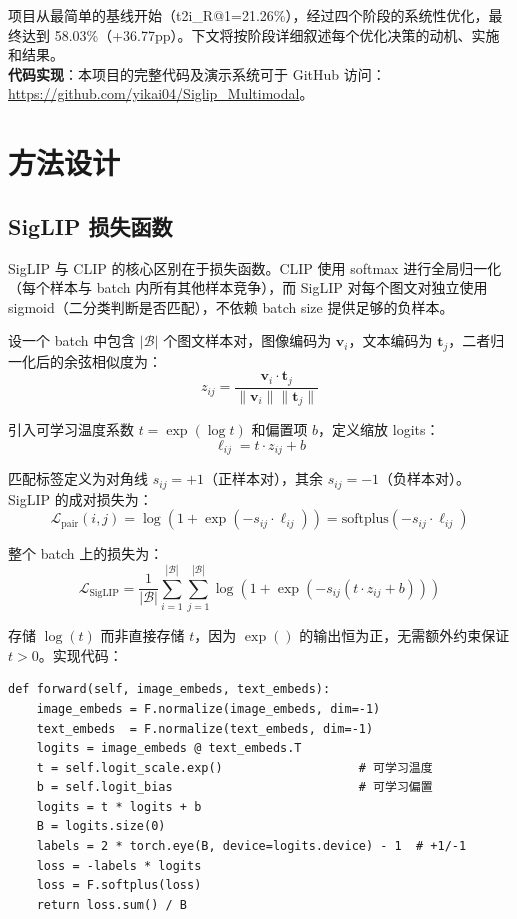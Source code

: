 \documentclass[12pt,a4paper]{article}
\begin{document}
项目从最简单的基线开始（t2i\_R@1=21.26\%），经过四个阶段的系统性优化，最终达到 58.03\%（+36.77pp）。下文将按阶段详细叙述每个优化决策的动机、实施和结果。\\

\vspace{1em}
\noindent \textbf{代码实现}：本项目的完整代码及演示系统可于 GitHub 访问：\url{https://github.com/yikai04/Siglip_Multimodal}。

\section{方法设计}

\subsection{SigLIP 损失函数}

SigLIP 与 CLIP 的核心区别在于损失函数。CLIP 使用 softmax 进行全局归一化（每个样本与 batch 内所有其他样本竞争），而 SigLIP 对每个图文对独立使用 sigmoid（二分类判断是否匹配），不依赖 batch size 提供足够的负样本。

设一个 batch 中包含 $|\mathcal{B}|$ 个图文样本对，图像编码为 $\mathbf{v}_i$，文本编码为 $\mathbf{t}_j$，二者归一化后的余弦相似度为：
\[
z_{ij} = \frac{\mathbf{v}_i \cdot \mathbf{t}_j}{\|\mathbf{v}_i\| \|\mathbf{t}_j\|}
\]

引入可学习温度系数 $t = \exp(\log t)$ 和偏置项 $b$，定义缩放 logits：
\[
\ell_{ij} = t \cdot z_{ij} + b
\]

匹配标签定义为对角线 $s_{ij}=+1$（正样本对），其余 $s_{ij}=-1$（负样本对）。SigLIP 的成对损失为：
\[
\mathcal{L}_{\text{pair}}(i,j) = \log\left(1 + \exp\left(-s_{ij} \cdot \ell_{ij}\right)\right) = \text{softplus}(-s_{ij} \cdot \ell_{ij})
\]

整个 batch 上的损失为：
\[
\mathcal{L}_{\text{SigLIP}} = \frac{1}{|\mathcal{B}|} \sum_{i=1}^{|\mathcal{B}|} \sum_{j=1}^{|\mathcal{B}|} \log\left(1 + \exp\left(-s_{ij}(t \cdot z_{ij} + b)\right)\right)
\]

存储 $\log(t)$ 而非直接存储 $t$，因为 $\exp()$ 的输出恒为正，无需额外约束保证 $t > 0$。实现代码：

\begin{lstlisting}[caption={SigLIP 损失函数 forward}]
def forward(self, image_embeds, text_embeds):
    image_embeds = F.normalize(image_embeds, dim=-1)
    text_embeds  = F.normalize(text_embeds, dim=-1)
    logits = image_embeds @ text_embeds.T
    t = self.logit_scale.exp()                   # 可学习温度
    b = self.logit_bias                          # 可学习偏置
    logits = t * logits + b
    B = logits.size(0)
    labels = 2 * torch.eye(B, device=logits.device) - 1  # +1/-1
    loss = -labels * logits
    loss = F.softplus(loss)
    return loss.sum() / B
\end{lstlisting}
\end{document}
